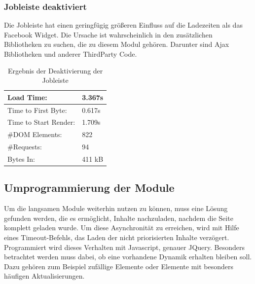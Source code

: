 \subsubsection{Jobleiste deaktiviert} Die Jobleiste hat einen geringfügig größeren Einfluss auf die Ladezeiten als das Facebook Widget. Die Ursache ist wahrscheinlich in den zusätzlichen Bibliotheken zu suchen, die zu diesem Modul gehören. Darunter sind Ajax Bibliotheken und anderer ThirdParty Code.

\begin{table}[!ht]
\centering
\caption{Ergebnis der Deaktivierung der Jobleiste}
    \begin{tabular}{ | p{3cm} | p{1.5cm} | }
    \hline
    Load Time: 			& 3.367s 	\\ \hline
    Time to First Byte:		& 0.617s  	\\ \hline
    Time to Start Render:	& 1.709s	\\ \hline
    \#DOM Elements:		& 822 		\\ \hline
    \#Requests:			& 94 		\\ \hline
    Bytes In:			& 411 kB 	\\ \hline
    \hline
    \end{tabular}
\end{table}

\subsection{Umprogrammierung der Module}
Um die langsamen Module weiterhin nutzen zu können, muss eine Lösung gefunden werden, die es ermöglicht, Inhalte nachzuladen, nachdem die Seite komplett geladen wurde. Um diese Asynchronität zu erreichen, wird mit Hilfe eines Timeout-Befehls, das Laden der nicht priorisierten Inhalte verzögert. Programmiert wird dieses Verhalten mit Javascript, genauer JQuery. Besonders betrachtet werden muss dabei, ob eine vorhandene Dynamik erhalten bleiben soll. Dazu gehören zum Beispiel zufällige Elemente oder Elemente mit besonders häufigen Aktualisierungen.

